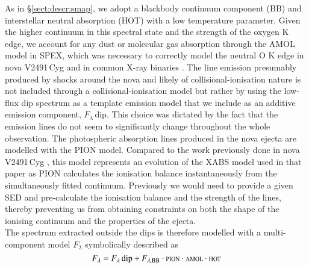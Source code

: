 \documentclass{aa}
\begin{document}
As in \S\ref{sect:descr:smap}, we adopt a blackbody continuum component
({\scriptsize{BB}}) and interstellar neutral absorption ({\scriptsize{HOT}}) with
a low temperature parameter. Given
the higher continuum in this spectral state and the strength of the oxygen K edge,
we account for any dust or molecular gas absorption through the {\scriptsize{AMOL}}
model in SPEX, which was necessary to correctly model the neutral O K edge
in nova V2491\,Cyg \citep{pinto12} and in common X-ray binaries \citep{Pinto2013}.
The line emission presumably produced by shocks around the nova and likely of
collisional-ionisation nature is not included through a collisional-ionisation
model but rather by using the low-flux dip spectrum as a template emission model
that we include as an additive emission component, {\scriptsize{$F_\lambda$\,dip}}.
This choice was dictated by the fact that the emission lines do not seem to
significantly change throughout the whole observation. The photospheric absorption
lines produced in the nova ejecta are modelled with the {\scriptsize{PION}} model.
Compared to the work previously done in nova V2491\,Cyg \citep{pinto12}, this model
represents an evolution of the {\scriptsize{XABS}} model used in that paper as
{\scriptsize{PION}} calculates the ionisation balance instantaneously from the
simultaneously fitted continuum. Previously we would need to provide a given
SED and pre-calculate the ionisation balance and the strength of the lines,
thereby preventing us from obtaining constraints on both the shape of the
ionising continuum and the properties of the ejecta.\\

The spectrum extracted outside the dips is therefore modelled with a
multi-component model $F_\lambda$ symbolically described as
\begin{equation}
 F_\lambda =F_\lambda\,{\rm dip} + F_{\lambda,\mathrm{BB}} \cdot {\scriptstyle{\rm PION}} \cdot {\scriptstyle{\rm AMOL}} \cdot {\scriptstyle{\rm HOT}}
\end{equation}
\end{document}
